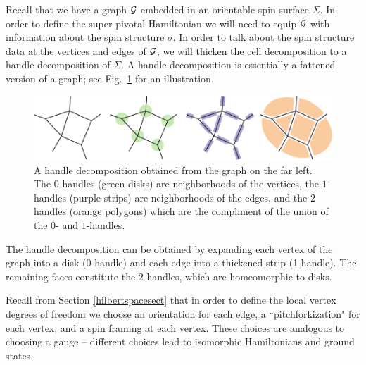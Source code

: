Recall that we have a graph $\mathcal{G}$ embedded in an orientable spin surface $\Sigma$.
In order to define the super pivotal Hamiltonian we will need to equip $\mathcal{G}$ with information about the spin structure $\sigma$. 
In order to talk about the spin structure data at the vertices and edges of $\mathcal{G}$, we will thicken the cell decomposition to a handle decomposition of $\Sigma$.
A handle decomposition is essentially a fattened version of a graph; see Fig.~\ref{HandleDecomposition} for an illustration.
\begin{figure}
  \includegraphics{HandleDecomposition.pdf}
  \caption{A handle decomposition obtained from the graph on the far left.
  The $0$ handles (green disks) are neighborhoods of the vertices, the $1$-handles (purple strips) are neighborhoods of the edges, 
  and the $2$ handles (orange polygons) which are the compliment of the union of the $0$- and $1$-handles.}
  \label{HandleDecomposition}
\end{figure}
The handle decomposition can be obtained by expanding each vertex of the graph into a disk ($0$-handle) and each edge into
a thickened strip (1-handle).
The remaining faces constitute the $2$-handles, which are homeomorphic to disks.

Recall from Section \ref{hilbertspacesect} that 
in order to define the local vertex degrees of freedom we choose an orientation for each edge, a ``pitchforkization" for each vertex, and a spin framing at each vertex.
These choices are analogous to choosing a gauge -- different choices lead to isomorphic Hamiltonians and ground states.


